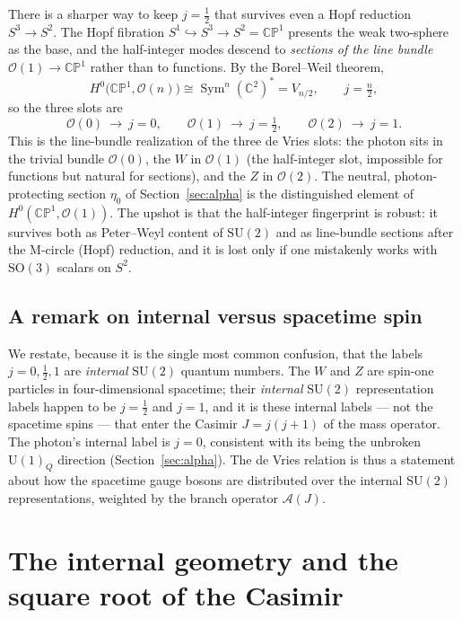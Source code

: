 \documentclass[11pt]{article}
\theoremstyle{plain}
\theoremstyle{definition}
\newcommand{\cA}{\mathcal{A}}
\newcommand{\cO}{\mathcal{O}}
\newcommand{\half}{\tfrac12}
\newcommand{\C}{\mathbb{C}}
\newcommand{\SU}{\mathrm{SU}}
\newcommand{\U}{\mathrm{U}}
\newcommand{\SO}{\mathrm{SO}}
\begin{document}
There is a sharper way to keep $j=\half$ that survives even a Hopf reduction
$S^3\to S^2$. The Hopf fibration $S^1\hookrightarrow S^3\to S^2=\mathbb{CP}^1$
presents the weak two-sphere as the base, and the half-integer modes
descend to \emph{sections of the line bundle} $\cO(1)\to\mathbb{CP}^1$
rather than to functions. By the Borel--Weil theorem,
\begin{equation}
H^0\bigl(\mathbb{CP}^1,\cO(n)\bigr)\cong\operatorname{Sym}^n(\C^2)^*=V_{n/2},
\qquad j=\tfrac n2,
\end{equation}
so the three slots are
\begin{equation}
\cO(0)\ \to\ j=0,\qquad
\cO(1)\ \to\ j=\tfrac12,\qquad
\cO(2)\ \to\ j=1.
\end{equation}
This is the line-bundle realization of the three de Vries slots: the photon
sits in the trivial bundle $\cO(0)$, the $W$ in $\cO(1)$ (the half-integer
slot, impossible for functions but natural for sections), and the $Z$ in
$\cO(2)$. The neutral, photon-protecting section $\eta_0$ of
Section~\ref{sec:alpha} is the distinguished element of $H^0(\mathbb{CP}^1,
\cO(1))$. The upshot is that the half-integer fingerprint is robust: it
survives both as Peter--Weyl content of $\SU(2)$ and as line-bundle sections
after the M-circle (Hopf) reduction, and it is lost only if one mistakenly
works with $\SO(3)$ scalars on $S^2$.

\subsection{A remark on internal versus spacetime spin}

We restate, because it is the single most common confusion, that the labels
$j=0,\half,1$ are \emph{internal} $\SU(2)$ quantum numbers. The $W$ and $Z$
are spin-one particles in four-dimensional spacetime; their \emph{internal}
$\SU(2)$ representation labels happen to be $j=\half$ and $j=1$, and it is
these internal labels --- not the spacetime spins --- that enter the Casimir
$J=j(j+1)$ of the mass operator. The photon's internal label is $j=0$,
consistent with its being the unbroken $\U(1)_Q$ direction
(Section~\ref{sec:alpha}). The de Vries relation is thus a statement about
how the spacetime gauge bosons are distributed over the internal $\SU(2)$
representations, weighted by the branch operator $\cA(J)$.

\section{The internal geometry and the square root of the Casimir}
\label{sec:geometry}
\end{document}

